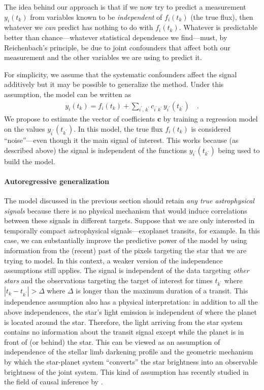 \documentclass[letterpaper,12pt,preprint]{aastex}
\begin{document}
The idea behind our approach is that if we now try to predict a measurement
$y_i (t_k)$ from variables known to be \emph{independent} of $f_i (t_k)$ (the
true flux), then whatever we \emph{can} predict has nothing to do with
$f_i (t_k)$.
Whatever is predictable better than chance---whatever statistical dependence
we find---must, by Reichenbach's principle, be due to joint confounders that
affect both our measurement and the other variables we are using to predict
it.

For simplicity, we assume that the systematic confounders affect the signal
additively but it may be possible to generalize the method.
Under this assumption, the model can be written as
\begin{eqnarray}
y_i(t_k) = f_i (t_k) + \sum_{i^\prime,\,k^\prime} c_{i^\prime\,k^\prime}\,
    y_{i^\prime} (t_{k^\prime}) \quad.
\end{eqnarray}
We propose to estimate the vector of coefficients $\mathbf{c}$ by training a
regression model on the values $y_{i^\prime} (t_{k^\prime})$.
In this model, the true flux $f_i (t_k)$ is considered ``noise''---even though
it the main signal of interest.
This works because (as described above) the signal is independent of the
functions $y_{i^\prime} (t_{k^\prime})$ being used to build the model.

\paragraph{Autoregressive generalization}
The model discussed in the previous section should retain \emph{any true
astrophysical signals} because there is no physical mechanism that would
induce correlations between these signals in different targets.
Suppose that we are only interested in temporally compact astrophysical
signals---exoplanet transits, for example.
In this case, we can substantially improve the predictive power of the model
by using information from the (recent) past of the pixels targeting the star
that we are trying to model.
In this context, a weaker version of the independence assumptions still
applies.
The signal is independent of the data targeting \emph{other stars} and the
observations targeting the target of interest for times $t_{k^\prime}$ where
$|t_k - t_{k^\prime}| > \Delta$ where $\Delta$ is longer than the maximum
duration of a transit.
This independence assumption also has a physical interpretation: in addition
to all the above independences, the star's light emission is independent of
where the planet is located around the star.
Therefore, the light arriving from the star system contains no information
about the transit signal except while the planet is in front of (or behind)
the star.
This can be viewed as an assumption of independence of the stellar limb
darkening profile and the geometric mechanism by which the
star-planet system ``converts'' the star brightness into an observable
brightness of the joint system.
This kind of assumption has recently studied in the field of causal inference
by \citet{JanSch10}.
\end{document}

